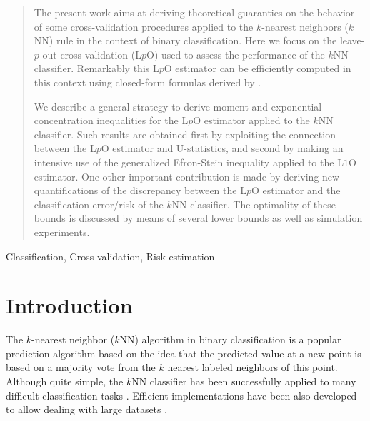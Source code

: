 \documentclass[twoside,11pt]{article}
\numberwithin{equation}{section}
\newcommand{\1}{\mathds{1}}%
\numberwithin{equation}{section}
\theoremstyle{plain}
\begin{document}
\begin{abstract}%
%
The present work aims at deriving theoretical guaranties on the behavior of some cross-validation procedures applied to the $k$-nearest neighbors ($k$NN) rule in the context of binary classification.
%
Here we focus on the leave-$p$-out cross-validation (L$p$O) used to assess the performance of the $k$NN classifier. Remarkably this L$p$O estimator can be efficiently computed in this context using closed-form formulas derived by \cite{CelisseMaryHuard11}.


We describe a general strategy to derive moment and exponential concentration inequalities for the L$p$O estimator applied to the $k$NN classifier.
%
Such results are obtained first by exploiting the connection between the L$p$O estimator and U-statistics, and second by making an intensive use of the generalized Efron-Stein inequality applied to the L$1$O estimator.
%
One other important contribution is made by deriving new quantifications of the discrepancy between the L$p$O estimator and the classification error/risk of the $k$NN classifier. The optimality of these bounds is discussed by means of several lower bounds as well as simulation experiments.
%
\end{abstract}


\begin{keywords}
Classification, Cross-validation, Risk estimation
\end{keywords}











\section{Introduction} \label{Section: Introduction}

The $k$-nearest neighbor ($k$NN) algorithm \citep{FixHodges51} in binary classification is a popular prediction algorithm based on the idea that the predicted value at a new point is based on a majority vote from the $k$ nearest labeled neighbors of this point.
%
Although quite simple, the $k$NN classifier has been successfully applied to many difficult classification tasks \citep{Li04,Simard98,Scheirer03}. Efficient implementations have been also developed to allow dealing with large datasets \citep{Indyk98,Andoni06}.
\end{document}
